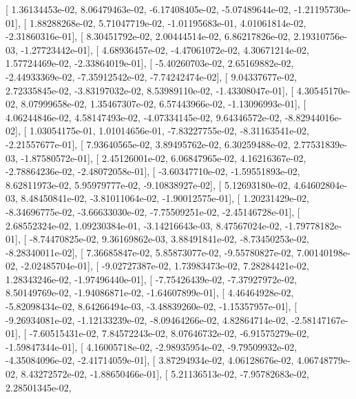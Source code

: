 \documentclass{article}
\begin{document}
       [  1.36134453e-02,   8.06479463e-02,  -6.17408405e-02,
         -5.07489644e-02,  -1.21195730e-01],
       [  1.88288268e-02,   5.71047719e-02,  -1.01195683e-01,
          4.01061814e-02,  -2.31860316e-01],
       [  8.30451792e-02,   2.00444514e-02,   6.86217826e-02,
          2.19310756e-03,  -1.27723442e-01],
       [  4.68936457e-02,  -4.47061072e-02,   4.30671214e-02,
          1.57724469e-02,  -2.33864019e-01],
       [ -5.40260703e-02,   2.65169882e-02,  -2.44933369e-02,
         -7.35912542e-02,  -7.74242474e-02],
       [  9.04337677e-02,   2.72335845e-02,  -3.83197032e-02,
          8.53989110e-02,  -1.43308047e-01],
       [  4.30545170e-02,   8.07999658e-02,   1.35467307e-02,
          6.57443966e-02,  -1.13096993e-01],
       [  4.06244846e-02,   4.58147493e-02,  -4.07334145e-02,
          9.64346572e-02,  -8.82944016e-02],
       [  1.03054175e-01,   1.01014656e-01,  -7.83227755e-02,
         -8.31163541e-02,  -2.21557677e-01],
       [  7.93640565e-02,   3.89495762e-02,   6.30259488e-02,
          2.77531839e-03,  -1.87580572e-01],
       [  2.45126001e-02,   6.06847965e-02,   4.16216367e-02,
         -2.78864236e-02,  -2.48072058e-01],
       [ -3.60347710e-02,  -1.59551893e-02,   8.62811973e-02,
          5.95979777e-02,  -9.10838927e-02],
       [  5.12693180e-02,   4.64602804e-03,   8.48450841e-02,
         -3.81011064e-02,  -1.90012575e-01],
       [  1.20231429e-02,  -8.34696775e-02,  -3.66633030e-02,
         -7.75509251e-02,  -2.45146728e-01],
       [  2.68552324e-02,   1.09230384e-01,  -3.14216643e-03,
          8.47567024e-02,  -1.79778182e-01],
       [ -8.74470825e-02,   9.36169862e-03,   3.88491841e-02,
         -8.73450253e-02,  -8.28340011e-02],
       [  7.36685847e-02,   5.85873077e-02,  -9.55780827e-02,
          7.00140198e-02,  -2.02485704e-01],
       [ -9.02727387e-02,   1.73983473e-02,   7.28284421e-02,
          1.28343246e-02,  -1.97496440e-01],
       [ -7.75426439e-02,  -7.37927972e-02,   8.50149769e-02,
         -1.94086871e-02,  -1.64607899e-01],
       [  4.46464928e-02,  -5.82098434e-02,   8.64266494e-03,
         -3.48839260e-02,  -1.15357957e-01],
       [ -9.26934081e-02,  -1.12133239e-02,  -8.09464266e-02,
          4.82864714e-02,  -2.58147167e-01],
       [ -7.60515431e-02,   7.84572243e-02,   8.07646732e-02,
         -6.91575279e-02,  -1.59847344e-01],
       [  4.16005718e-02,  -2.98935954e-02,  -9.79509932e-02,
         -4.35084096e-02,  -2.41714059e-01],
       [  3.87294934e-02,   4.06128676e-02,   4.06748779e-02,
          8.43272572e-02,  -1.88650466e-01],
       [  5.21136513e-02,  -7.95782683e-02,   2.28501345e-02,
\end{document}
